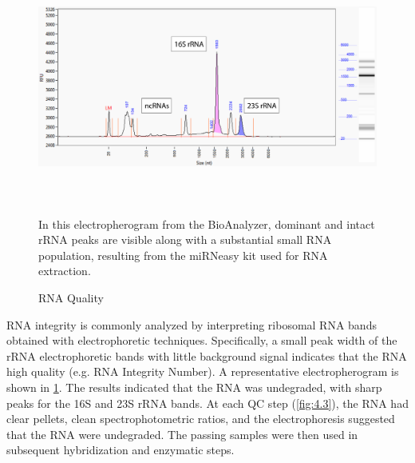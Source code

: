 \begin{figure}
\includegraphics[width=\textwidth,height=3in]{images/Sequencing/RNA-integrity.png}
\caption{RNA Quality}\label{fig:4.2}
In this electropherogram from the BioAnalyzer, dominant and intact rRNA peaks are visible along with a substantial small RNA population, resulting from the miRNeasy kit used for RNA extraction.
\end{figure}

RNA integrity is commonly analyzed by interpreting ribosomal RNA bands obtained with electrophoretic techniques. Specifically, a small peak width of the rRNA electrophoretic bands with little background signal indicates that the RNA high quality (e.g. RNA Integrity Number). A representative electropherogram is shown in \ref{fig:4.2}. The results indicated that the RNA was undegraded, with sharp peaks for the 16S and 23S rRNA bands. At each QC step (\ref{fig:4.3}), the RNA had clear pellets, clean spectrophotometric ratios, and the electrophoresis suggested that the RNA were undegraded. The passing samples were then used in subsequent hybridization and enzymatic steps.

